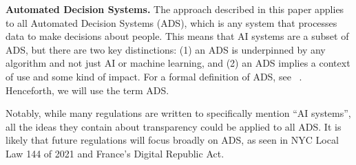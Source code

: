 \label{terms}

{\bf Automated Decision Systems.} The approach described in this paper applies to all Automated Decision Systems (ADS), which is any system that processes data to make decisions about people. This means that AI systems are a subset of ADS, but there are two key distinctions: (1) an ADS is underpinned by any algorithm and not just AI or machine learning, and (2) an ADS implies a context of use and some kind of impact. For a formal definition of ADS, see ~\cite{DBLP:journals/pvldb/StoyanovichHJ20}. Henceforth, we will use the term ADS.

Notably, while many regulations are written to specifically mention ``AI systems'', all the ideas they contain about transparency could be applied to all ADS. It is likely that future regulations will focus broadly on ADS, as seen in NYC Local Law 144 of 2021 and France's Digital Republic Act.










